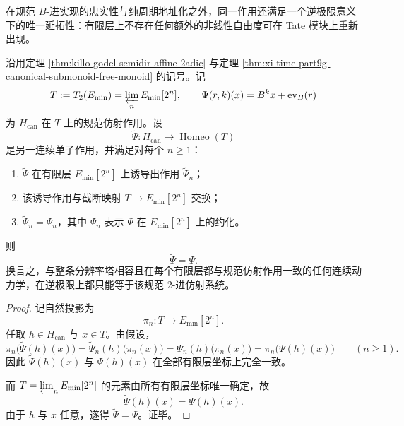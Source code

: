 在规范 \(B\)-进实现的忠实性与纯周期地址化之外，同一作用还满足一个逆极限意义下的唯一延拓性：有限层上不存在任何额外的非线性自由度可在 Tate 模块上重新出现。

\begin{theorem}[跨分辨率仿射刚性]\label{thm:xi-time-part9g-cross-resolution-affine-rigidity}
沿用定理 \ref{thm:killo-godel-semidir-affine-2adic} 与定理
\ref{thm:xi-time-part9g-canonical-submonoid-free-monoid} 的记号。记
\[
T:=T_2(E_{\min})=\varprojlim_{n}E_{\min}[2^n],
\qquad
\Psi(r,k)(x)=B^k x+\operatorname{ev}_B(r)
\]
为 \(H_{\mathrm{can}}\) 在 \(T\) 上的规范仿射作用。设
\[
\widetilde\Psi:H_{\mathrm{can}}\longrightarrow \operatorname{Homeo}(T)
\]
是另一连续单子作用，并满足对每个 \(n\ge 1\)：
\begin{enumerate}
  \item \(\widetilde\Psi\) 在有限层 \(E_{\min}[2^n]\) 上诱导出作用
  \(\widetilde\Psi_n\)；
  \item 该诱导作用与截断映射 \(T\to E_{\min}[2^n]\) 交换；
  \item \(\widetilde\Psi_n=\Psi_n\)，其中 \(\Psi_n\) 表示 \(\Psi\) 在
  \(E_{\min}[2^n]\) 上的约化。
\end{enumerate}
则
\[
\widetilde\Psi=\Psi.
\]
换言之，与整条分辨率塔相容且在每个有限层都与规范仿射作用一致的任何连续动力学，在逆极限上都只能等于该规范 \(2\)-进仿射系统。
\end{theorem}
\begin{proof}
记自然投影为
\[
\pi_n:T\longrightarrow E_{\min}[2^n].
\]
任取 \(h\in H_{\mathrm{can}}\) 与 \(x\in T\)。由假设，
\[
\pi_n\bigl(\widetilde\Psi(h)(x)\bigr)
=
\widetilde\Psi_n(h)\bigl(\pi_n(x)\bigr)
=
\Psi_n(h)\bigl(\pi_n(x)\bigr)
=
\pi_n\bigl(\Psi(h)(x)\bigr)
\qquad (n\ge 1).
\]
因此 \(\widetilde\Psi(h)(x)\) 与 \(\Psi(h)(x)\) 在全部有限层坐标上完全一致。

而 \(T=\varprojlim_n E_{\min}[2^n]\) 的元素由所有有限层坐标唯一确定，故
\[
\widetilde\Psi(h)(x)=\Psi(h)(x).
\]
由于 \(h\) 与 \(x\) 任意，遂得 \(\widetilde\Psi=\Psi\)。证毕。
\end{proof}

\endinput
